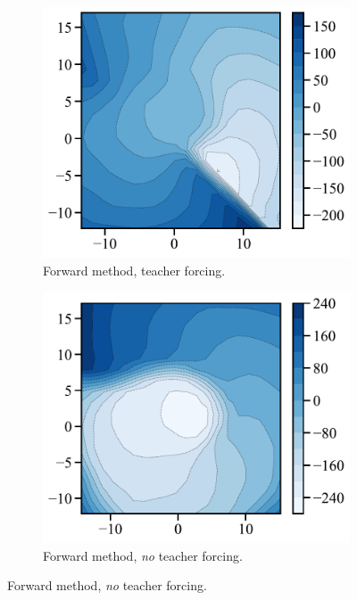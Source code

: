 \begin{figure}[t]
     \centering
     \begin{subfigure}[t]{0.24\textwidth}
         \centering
         \caption{Forward method, \protect\newline teacher forcing.}
         \includegraphics[width=\textwidth]{figures/fig_energy_explicit_spiral_tf.pdf}
     \end{subfigure}
     \hfill
     \begin{subfigure}[t]{0.24\textwidth}
         \centering
         \caption{Forward method, \protect\newline \emph{no} teacher forcing.}
         \includegraphics[width=\textwidth]{figures/fig_energy_explicit_spiral.pdf}

\end{subfigure}
\end{figure}

